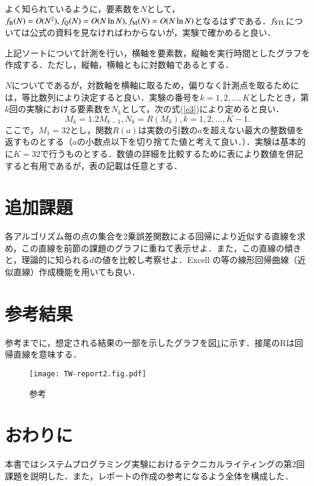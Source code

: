 \documentclass[fleqn, a4paper. 12pt]{ltjsarticle} %
\begin{document}
    よく知られているように，要素数を$N$として，$f_\mathrm{B}(N) = O(N^2), f_\mathrm{Q}(N) = O(N\ln N), f_\mathrm{M}(N) = O(N\ln N)$となるはずである\cite{Sort}．$f_\mathrm{STL}$については公式の資料を見なければわからないが，実験で確かめると良い．
    
    上記ソートについて計測を行い，横軸を要素数，縦軸を実行時間としたグラフを作成する．ただし，縦軸，横軸ともに対数軸であるとする．

    $N$についてであるが，対数軸を横軸に取るため，偏りなく計測点を取るためには，等比数列により決定すると良い．実験の番号を$k=1, 2,..., K$としたとき，第$k$回の実験における要素数を$N_k$として，次の式(\ref{e3})により定めると良い．
    \begin{equation}
        \label{e3}
        M_k = 1.2M_{k-1}, N_k = R(M_k), k=1,2,...,K-1.
    \end{equation}
    ここで，$M_1 = 32$とし，関数$R(a)$は実数の引数の$a$を超えない最大の整数値を返すものとする（$a$の小数点以下を切り捨てた値と考えて良い．）．実験は基本的に$K=32$で行うものとする．数値の詳細を比較するために表により数値を併記すると有用であるが，表の記載は任意とする．


    \section{追加課題}
    各アルゴリズム毎の点の集合を2乗誤差関数による回帰により近似する直線を求め，この直線を前節の課題のグラフに重ねて表示せよ．また，この直線の傾きと，理論的に知られる$d$の値を比較し考察せよ．Excell の等の線形回帰曲線（近似直線）作成機能を用いても良い．
    \section{参考結果}
    参考までに，想定される結果の一部を示したグラフを図\ref{f1}に示す．接尾のRは回帰直線を意味する．
    \begin{figure}
        \texttt{[image: TW-report2.fig.pdf]}
        \caption{参考}
        \label{f1}
    \end{figure}
    \section{おわりに}
    本書ではシステムプログラミング実験におけるテクニカルライティングの第2回課題を説明した．また，レポートの作成の参考になるよう全体を構成した．
\end{document}
